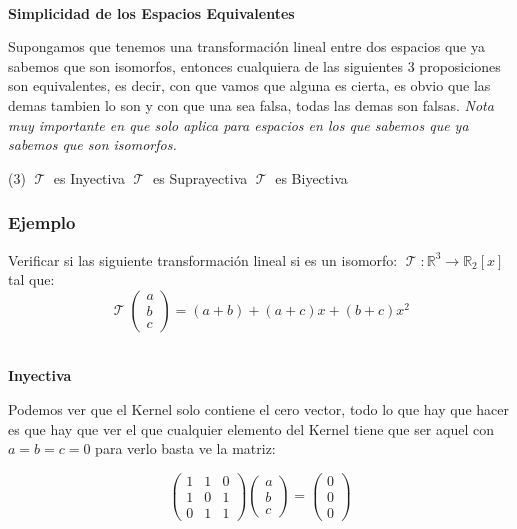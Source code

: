 \documentclass[12pt]{report}                                %
\DeclareMathOperator \LinealTransformation {\mathcal{T}}
\begin{document}
            \textbf{\\Simplicidad de los Espacios Equivalentes}

            Supongamos que tenemos una transformación lineal entre dos espacios que ya
            sabemos que son isomorfos, entonces cualquiera de las siguientes 3 proposiciones
            son equivalentes, es decir, con que vamos que alguna es cierta, es obvio que las
            demas tambien lo son y con que una sea falsa, todas las demas son falsas.
            \emph{Nota muy importante en que solo aplica para espacios en los que sabemos que ya sabemos que son isomorfos.}

            \begin{tasks}(3)
                \task $\LinealTransformation$ es Inyectiva
                \task $\LinealTransformation$ es Suprayectiva
                \task $\LinealTransformation$ es Biyectiva
            \end{tasks}



            \clearpage
            \subsubsection{Ejemplo}
            Verificar si las siguiente transformación lineal si es un isomorfo:
            $\LinealTransformation : \mathbb{R}^3 \to \mathbb{R}_2[x]$ tal que: 
            \begin{equation*}
            \LinealTransformation(\begin{matrix}a\\b\\c\end{matrix}) = (a+b)+(a+c)x+(b+c)x^2
            \end{equation*}


            \textbf{\\Inyectiva}

            Podemos ver que el Kernel solo contiene el cero vector, todo lo que hay que hacer es
            que hay que ver el que cualquier elemento del Kernel tiene que ser aquel con $a=b=c=0$
            para verlo basta ve la matriz:

            \begin{equation*}
            \begin{pmatrix}1&1&0\\1&0&1\\0&1&1\end{pmatrix}
                \begin{pmatrix}a\\b\\c\end{pmatrix}=
                \begin{pmatrix}0\\0\\0\end{pmatrix}
            \end{equation*}
\end{document}
